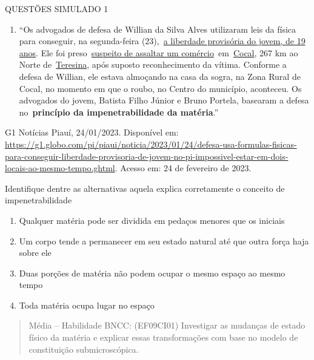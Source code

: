 QUESTÕES SIMULADO 1

\begin{enumerate}
\def\labelenumi{\arabic{enumi})}
\item
  ``Os advogados de defesa de Willian da Silva Alves utilizaram leis da
  física para conseguir, na segunda-feira
  (23),~\href{https://g1.globo.com/pi/piaui/noticia/2023/01/24/apos-uma-semana-preso-justica-concede-liberdade-a-jovem-negro-no-piaui-defesa-alega-inocencia-dias-sem-dormir.ghtml}{a
  liberdade provisória do jovem, de 19 anos}. Ele foi
  preso~\href{https://g1.globo.com/pi/piaui/noticia/2023/01/20/protesto-pede-soltura-de-jovem-negro-preso-por-assalto-no-piaui-defender-inocente-e-muito-mais-dificil-que-defender-culpado.ghtml}{suspeito
  de assaltar um
  comércio}~em~\href{https://g1.globo.com/pi/piaui/cidade/cocal/}{Cocal},
  267 km ao Norte
  de~\href{https://g1.globo.com/pi/piaui/cidade/teresina/}{Teresina},
  após suposto reconhecimento da vítima. Conforme a defesa de Willian,
  ele estava almoçando na casa da sogra, na Zona Rural de Cocal, no
  momento em que o roubo, no Centro do município, aconteceu. Os
  advogados do jovem, Batista Filho Júnior e Bruno Portela, basearam a
  defesa no~\textbf{princípio da impenetrabilidade da matéria}.''
\end{enumerate}

G1 Notícias Piauí, 24/01/2023. Disponível em:
\url{https://g1.globo.com/pi/piaui/noticia/2023/01/24/defesa-usa-formulas-fisicas-para-conseguir-liberdade-provisoria-de-jovem-no-pi-impossivel-estar-em-dois-locais-ao-mesmo-tempo.ghtml}.
Acesso em: 24 de fevereiro de 2023.

Identifique dentre as alternativas aquela explica corretamente o
conceito de impenetrabilidade

\begin{enumerate}
\def\labelenumi{(\Alph{enumi})}
\item
  Qualquer matéria pode ser dividida em pedaços menores que os iniciais
\item
  Um corpo tende a permanecer em seu estado natural até que outra força
  haja sobre ele
\item
  Duas porções de matéria não podem ocupar o mesmo espaço ao mesmo tempo
\item
  Toda matéria ocupa lugar no espaço
\end{enumerate}

\begin{quote}
Média -- Habilidade BNCC: (EF09CI01) Investigar as mudanças de estado
físico da matéria e explicar essas transformações com base no modelo de
constituição submicroscópica.
\end{quote}

